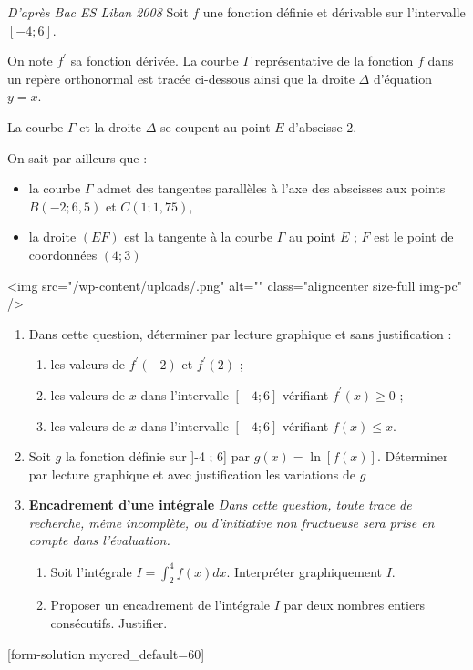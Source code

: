
%
\textit{D'après Bac ES Liban 2008}
Soit $f$ une fonction définie et dérivable sur l'intervalle $\left[-4 ; 6\right]$.
\par
On note $f^{\prime}$ sa fonction dérivée. La courbe $\Gamma $ représentative de la fonction $f$ dans un repère orthonormal est tracée ci-dessous ainsi que la droite $\Delta $ d'équation $y=x$.
\par
La courbe $\Gamma $ et la droite $\Delta $ se coupent au point $E$ d'abscisse $2$.
\par
On sait par ailleurs que :
\begin{itemize}
     \item
     la courbe $\Gamma $ admet des tangentes parallèles à l'axe des abscisses aux points $B \left(-2 ; 6,5\right)$ et $C\left(1 ; 1,75\right)$,
     \item
     la droite $\left(EF\right)$ est la tangente à la courbe $\Gamma $ au point $E$ ; $F$ est le point de coordonnées $\left(4 ; 3\right)$
\end{itemize}

\begin{center}
\end{center}
<img src="/wp-content/uploads/.png" alt="" class="aligncenter size-full  img-pc" />
\begin{enumerate}
     \item
     Dans cette question, déterminer par lecture graphique et sans justification :
     \begin{enumerate}
          \item
          les valeurs de $f^{\prime}\left(-2\right)$ et $f^{\prime}\left(2\right)$ ;
          \item
          les valeurs de $x$ dans l'intervalle $\left[-4 ; 6\right]$ vérifiant $f^{\prime}\left(x\right)\geqslant 0$ ;
          \item
          les valeurs de $x$ dans l'intervalle $\left[-4 ; 6\right]$ vérifiant $f\left(x\right) \leqslant x$.
     \end{enumerate}
     \item
     Soit $g$ la fonction définie sur ]-4 ; 6] par $g\left(x\right)=\ln\left[f\left(x\right)\right]$. Déterminer par lecture graphique et avec justification les variations de $g$
     \item
     \textbf{Encadrement d'une intégrale}
     \textit{Dans cette question, toute trace de recherche, même incomplète, ou d'initiative non fructueuse sera prise en compte dans l'évaluation.}
     \begin{enumerate}
          \item
          Soit l'intégrale $I=\int_{ 2}^{ 4} f\left(x\right) dx$. Interpréter graphiquement $I$.
          \item
          Proposer un encadrement de l'intégrale $I$ par deux nombres entiers consécutifs. Justifier.
     \end{enumerate}
\end{enumerate}
[form-solution mycred_default=60]
